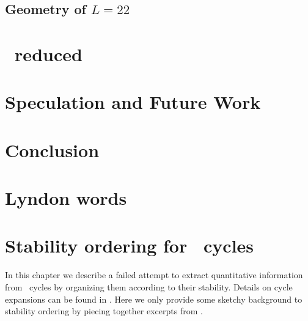     \section{Geometry of $L=22$ \statesp}
    \label{sec:L22}
    

\chapter{\KS\ reduced \statesp}
    \label{chap:kseRedStSp}	
    


\chapter{Speculation and Future Work}
   \label{chap:tobedone}
   

\chapter{Conclusion}
   \label{chap:concl}
   


\appendix

\chapter{Lyndon words}


\chapter{Stability ordering for \KS\ cycles}
\label{chap:POT} 	
In this chapter we describe a failed attempt to extract
quantitative information from \KSe\ cycles by
organizing them according to their stability.
Details on cycle expansions can be found in .
Here we only provide some sketchy background to stability ordering
by piecing together excerpts from .
	
